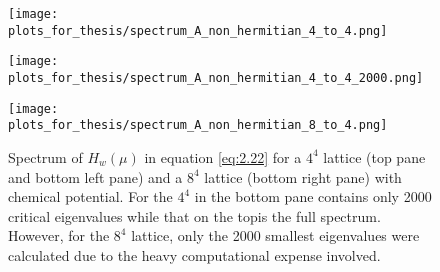 \begin{figure}[H]
    \centering
    \begin{minipage}{0.9\textwidth} %
        \centering
        \texttt{[image: plots\_for\_thesis/spectrum\_A\_non\_hermitian\_4\_to\_4.png]} %
    \end{minipage}

    \vspace{0.02\textwidth} %

    \begin{minipage}{0.45\textwidth}
        \centering
        \texttt{[image: plots\_for\_thesis/spectrum\_A\_non\_hermitian\_4\_to\_4\_2000.png]} %
    \end{minipage}%
    \hspace{0.02\textwidth} %
    \begin{minipage}{0.45\textwidth}
        \centering
        \texttt{[image: plots\_for\_thesis/spectrum\_A\_non\_hermitian\_8\_to\_4.png]} %
    \end{minipage}
    \caption{\small Spectrum of $ H_w(\mu)$ in equation \eqref{eq:2.22} for a $4^4$ lattice (top pane and bottom left pane) and a $8^4$ lattice (bottom right pane) with chemical potential. For the $4^4$ in the bottom pane contains only 2000 critical eigenvalues while that on the topis the full spectrum. However, for the $8^4$ lattice, only the 2000 smallest eigenvalues were calculated due to the heavy computational expense involved.}
    \label{fig:spectrum_A}
\end{figure}

